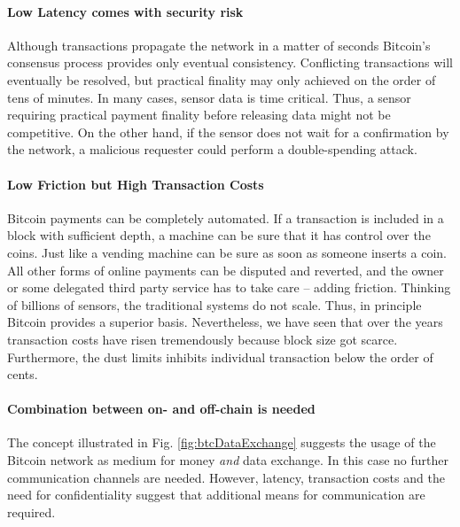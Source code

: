 \paragraph{Low Latency comes with security risk}

Although transactions propagate the network in a matter of seconds Bitcoin's consensus process provides only eventual consistency. Conflicting transactions will eventually be resolved, but practical finality may only achieved on the order of tens of minutes. In many cases, sensor data is time critical. Thus, a sensor requiring practical payment finality before releasing data might not be competitive. On the other hand, if the sensor does not wait for a confirmation by the network, a malicious requester could perform a double-spending attack. 

\paragraph{Low Friction but High Transaction Costs}

Bitcoin payments can be completely automated. If a transaction is included in a block with sufficient depth, a machine can be sure that it has control over the coins. Just like a vending machine can be sure as soon as someone inserts a coin.  All other forms of online payments can be disputed and reverted, and the owner or some delegated third party service has to take care -- adding friction. Thinking of billions of sensors, the traditional systems do not scale. Thus, in principle Bitcoin provides a superior basis. Nevertheless, we have seen that over the years transaction costs have risen tremendously because block size got scarce. Furthermore, the dust limits inhibits individual transaction below the order of cents.

\paragraph{Combination between on- and off-chain is needed}

The concept illustrated in Fig. \ref{fig:btcDataExchange} suggests the usage of the Bitcoin network as medium for money \emph{and} data exchange. In this case no further communication channels are needed. However, latency, transaction costs and the need for confidentiality suggest that additional means for communication are required. 

